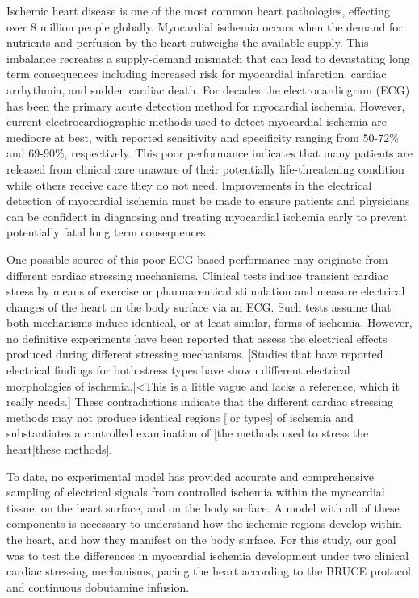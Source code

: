 \documentclass[twocolumn]{cinc}
\begin{document}
Ischemic heart disease is one of the most common heart pathologies,
effecting over 8 million people globally. \cite{Roth2015} Myocardial
ischemia occurs when the demand for nutrients and perfusion by the heart
outweighs the available supply. This imbalance recreates a supply-demand
mismatch that can lead to devastating long term consequences including
increased risk for myocardial infarction, cardiac arrhythmia, and sudden
cardiac death.\cite{Roth2015} For decades the electrocardiogram (ECG) has
been the primary acute detection method for myocardial
ischemia. \cite{McCarthy1990} However, current electrocardiographic
methods used to detect myocardial ischemia are mediocre at best, with
reported sensitivity and specificity ranging from 50-72\% and 69-90\%,
respectively. \cite{Akkerhuis2011} This poor performance indicates
that many patients are released from clinical care unaware of their
potentially life-threatening condition while others receive care they do
not need. Improvements in the electrical detection of myocardial ischemia
must be made to ensure patients and physicians can be confident in
diagnosing and treating myocardial ischemia early to prevent potentially
fatal long term consequences.

One possible source of this poor ECG-based performance may originate
from different cardiac stressing mechanisms. Clinical tests induce
transient cardiac stress by means of exercise or pharmaceutical stimulation
and measure electrical changes of the heart on the body surface via an
ECG. Such tests assume that both mechanisms induce identical, or at least
similar, forms of ischemia. However, no definitive experiments have been
reported that assess the electrical effects produced during
different stressing mechanisms. [Studies that have reported electrical
findings for both stress types have shown different electrical morphologies
of ischemia.|<This is a little vague and lacks a reference, which it really
needs.] These contradictions indicate that the different cardiac stressing
methods may not produce identical regions [|or types] of ischemia and
substantiates a controlled examination of [the methods used to stress the
heart|these methods].

To date, no experimental model has provided accurate and comprehensive sampling of
electrical signals from controlled ischemia within the myocardial
tissue, on the heart surface, and on the body surface. A model with all of these
components is necessary to understand how the ischemic regions develop
within the heart, and how they manifest on the body surface. For this
study, our goal was to test the differences in myocardial ischemia
development under two
clinical cardiac stressing mechanisms, pacing the heart according to the BRUCE protocol and continuous
dobutamine infusion.
\end{document}
